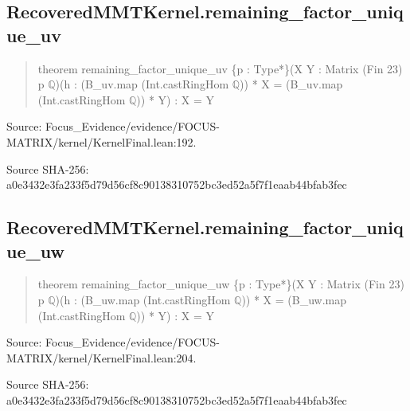 \documentclass[11pt,a4paper]{article}
\begin{document}
\begin{samepage}
\subsection{RecoveredMMTKernel.remaining\_factor\_unique\_uv}
\begin{quote}\small\ttfamily theorem remaining\_factor\_unique\_uv \{p : Type*\}\newline     (X Y : Matrix (Fin 23) p \ensuremath{\mathbb{Q}})\newline     (h : (B\_uv.map (Int.castRingHom \ensuremath{\mathbb{Q}})) * X = (B\_uv.map (Int.castRingHom \ensuremath{\mathbb{Q}})) * Y) : X = Y\end{quote}
{\small Source: Focus\_Evidence/evidence/FOCUS-MATRIX/kernel/KernelFinal.lean:192.\par}

{\small Source SHA-256: a0e3432e3fa233f5d79d56cf8c90138310752bc3ed52a5f7f1eaab44bfab3fec\par}

\end{samepage}
\begin{samepage}
\subsection{RecoveredMMTKernel.remaining\_factor\_unique\_uw}
\begin{quote}\small\ttfamily theorem remaining\_factor\_unique\_uw \{p : Type*\}\newline     (X Y : Matrix (Fin 23) p \ensuremath{\mathbb{Q}})\newline     (h : (B\_uw.map (Int.castRingHom \ensuremath{\mathbb{Q}})) * X = (B\_uw.map (Int.castRingHom \ensuremath{\mathbb{Q}})) * Y) : X = Y\end{quote}
{\small Source: Focus\_Evidence/evidence/FOCUS-MATRIX/kernel/KernelFinal.lean:204.\par}

{\small Source SHA-256: a0e3432e3fa233f5d79d56cf8c90138310752bc3ed52a5f7f1eaab44bfab3fec\par}

\end{samepage}
\end{document}
